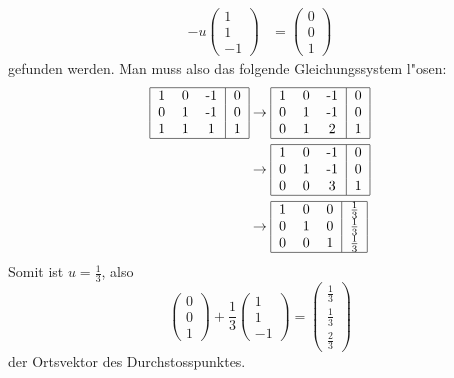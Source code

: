 \begin{loesung}
\begin{align*}
-u\begin{pmatrix}1\\1\\-1\end{pmatrix}
&=
\begin{pmatrix}0\\0\\1\end{pmatrix}
\end{align*}
gefunden werden.
Man muss also das folgende Gleichungssystem l"osen:
\begin{align*}
\begin{tabular}{|ccc|c|}
\hline
1&0&-1&0\\
0&1&-1&0\\
1&1&1&1\\
\hline
\end{tabular}
&\rightarrow
\begin{tabular}{|ccc|c|}
\hline
1&0&-1&0\\
0&1&-1&0\\
0&1&2&1\\
\hline
\end{tabular}
\\
&\rightarrow
\begin{tabular}{|ccc|c|}
\hline
1&0&-1&0\\
0&1&-1&0\\
0&0&3&1\\
\hline
\end{tabular}
\\
&\rightarrow
\begin{tabular}{|ccc|c|}
\hline
1&0&0&$\frac13$\\
0&1&0&$\frac13$\\
0&0&1&$\frac13$\\
\hline
\end{tabular}
\end{align*}
Somit ist $u=\frac13$, also
\[
\begin{pmatrix}0\\0\\1\end{pmatrix}+\frac13\begin{pmatrix}1\\1\\-1\end{pmatrix}
=
\begin{pmatrix}\frac13\\\frac13\\\frac23\end{pmatrix}
\]
der Ortsvektor des Durchstosspunktes.


\end{loesung}
